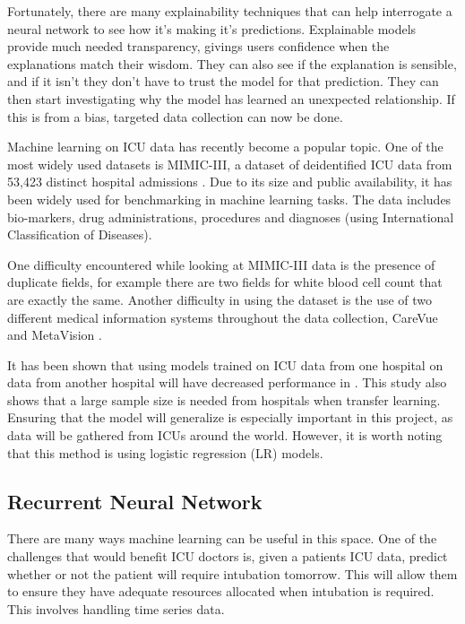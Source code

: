 \documentclass[12pt]{article}
\begin{document}
Fortunately, there are many explainability techniques that can help interrogate a neural network to see how it's making it's predictions. Explainable models provide much needed transparency, givings users confidence when the explanations match their wisdom. They can also see if the explanation is sensible, and if it isn't they don't have to trust the model for that prediction. They can then start investigating why the model has learned an unexpected relationship. If this is from a bias, targeted data collection can now be done.

Machine learning on ICU data has recently become a popular topic. One of the most widely used datasets is MIMIC-III, a dataset of deidentified ICU data from 53,423 distinct hospital admissions \cite{MIMICIIIdatabase}. Due to its size and public availability, it has been widely used for benchmarking in machine learning tasks. The data includes bio-markers, drug administrations, procedures and diagnoses (using International Classification of Diseases).

One difficulty encountered while looking at MIMIC-III data is the presence of duplicate fields, for example there are two fields for white blood cell count that are exactly the same. Another difficulty in using the dataset is the use of two different medical information systems throughout the data collection, CareVue and MetaVision \cite{MIMICIIIdatabase}. 

It has been shown that using models trained on ICU data from one hospital on data from another hospital will have decreased performance in \cite{ICUgeneralize}. This study also shows that a large sample size is needed from hospitals when transfer learning. Ensuring that the model will generalize is especially important in this project, as data will be gathered from ICUs around the world. However, it is worth noting that this method is using logistic regression (LR) models. 

\subsection{Recurrent Neural Network}

There are many ways machine learning can be useful in this space. One of the challenges that would benefit ICU doctors is, given a patients ICU data, predict whether or not the patient will require intubation tomorrow. This will allow them to ensure they have adequate resources allocated when intubation is required. This involves handling time series data.
\end{document}
